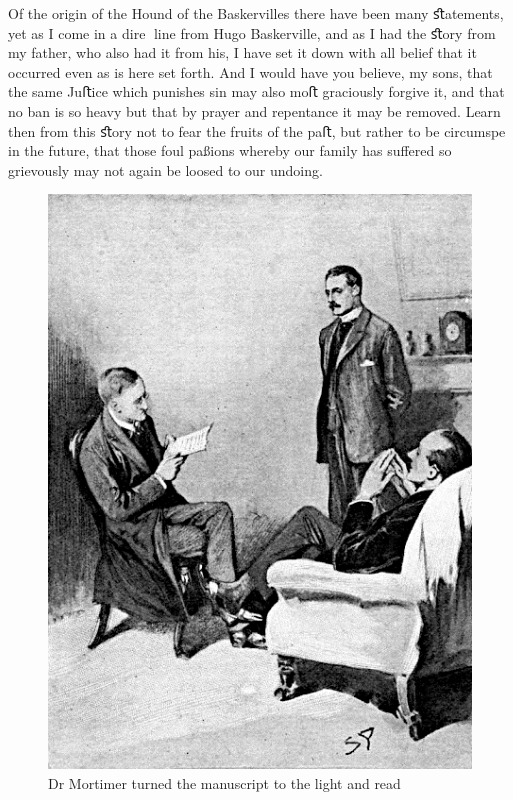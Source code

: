 \documentclass[paper=5.5in:8.5in,BCOR=7mm,twoside,DIV=calc,12pt,usegeometry,openany,chapterprefix,endperiod]{scrbook} %
\begin{document}
\vfill

\oldfont
Of the origin of the Hound of the Baskervilles there have been many ﬆatements, yet as I come in a dire line from Hugo Baskerville, and as I had the ﬆory from my father, who also had it from his, I have set it down with all belief that it occurred even as is here set forth. And I would have you believe, my sons, that the same Juﬅice which punishes sin may also moﬅ graciously forgive it, and that no ban is so heavy but that by prayer and repentance it may be removed. Learn then from this ﬆory not to fear the fruits of the paﬅ, but rather to be circumspe in the future, that those foul paßions whereby our family has suﬀered so grievously may not again be loosed to our undoing.

\begin{figure}[tbhp]
\centering
\includegraphics[width=\linewidth]{02_storyread}
\caption{Dr Mortimer turned the manuscript to the light and read}
\end{figure}
\end{document}
